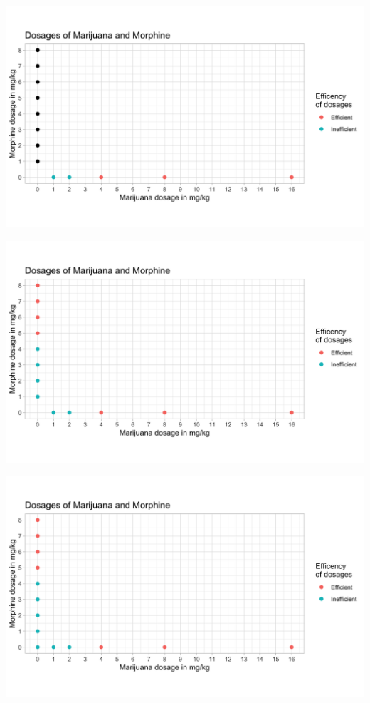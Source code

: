 \documentclass[14pt]{beamer}
\begin{document}
\begin{frame}
\begin{center}
\includegraphics[scale=0.24]{img3.png}
\end{center}
\end{frame}

\begin{frame}
\begin{center}
\includegraphics[scale=0.24]{img4.png}
\end{center}
\end{frame}

\begin{frame}
\begin{center}
\includegraphics[scale=0.24]{img5.png}
\end{center}
\end{frame}
\end{document}
